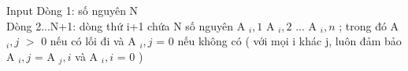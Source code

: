 Input
Dòng 1: số nguyên N   
\\   Dòng 2...N+1: dòng thứ i+1 chứa N số nguyên A   $_    i,1   $   A   $_    i,2   $   ... A   $_    i,n   $   ; trong đó A   $_    i,j   $   $>$ 0 nếu có lối đi và A   $_    i,j   $   = 0 nếu không có ( với mọi i khác j, luôn đảm bảo A   $_    i,j   $   = A   $_    j,i   $   và A   $_    i,i   $   = 0 )